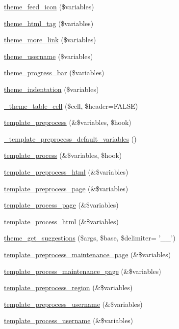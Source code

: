 \begin{DoxyCompactItemize}
\item 
\hyperlink{group__themeable_gaf7ed9df27bf344443ce927e3650adfbd}{theme\_\-feed\_\-icon} (\$variables)
\item 
\hyperlink{group__themeable_ga553aba4a879c7a0b01a85486ca0cea33}{theme\_\-html\_\-tag} (\$variables)
\item 
\hyperlink{group__themeable_ga1f35c4f1e512ae423df22c7a33edf043}{theme\_\-more\_\-link} (\$variables)
\item 
\hyperlink{group__themeable_ga94b6d36f659ae6bf42e7971682cd24eb}{theme\_\-username} (\$variables)
\item 
\hyperlink{group__themeable_ga9892ce57f458f8e372fb04b7a05bbc73}{theme\_\-progress\_\-bar} (\$variables)
\item 
\hyperlink{group__themeable_ga045159ba9e2be46a91a8883328963b2c}{theme\_\-indentation} (\$variables)
\item 
\hyperlink{includes_2theme_8inc_adf2a29e2c6631b7c0ecd833cafda9b40}{\_\-theme\_\-table\_\-cell} (\$cell, \$header=FALSE)
\item 
\hyperlink{includes_2theme_8inc_a3eeb7bcdba7ef4859f99586da264d347}{template\_\-preprocess} (\&\$variables, \$hook)
\item 
\hyperlink{includes_2theme_8inc_a1c517bff2855f9fb2b2949c66d1685db}{\_\-template\_\-preprocess\_\-default\_\-variables} ()
\item 
\hyperlink{includes_2theme_8inc_a9b4d56c55dab2c59b7af6f71d6b1a940}{template\_\-process} (\&\$variables, \$hook)
\item 
\hyperlink{includes_2theme_8inc_a5bc9f37111330a160833274482ad866a}{template\_\-preprocess\_\-html} (\&\$variables)
\item 
\hyperlink{includes_2theme_8inc_a128dae24f990d8ba4710ac78b0584c11}{template\_\-preprocess\_\-page} (\&\$variables)
\item 
\hyperlink{includes_2theme_8inc_aa9c8d115ebdc2baeae402b3d7e6b392b}{template\_\-process\_\-page} (\&\$variables)
\item 
\hyperlink{includes_2theme_8inc_abccf98b29e23c1a9249068558d687da7}{template\_\-process\_\-html} (\&\$variables)
\item 
\hyperlink{includes_2theme_8inc_af13ff730d76e46395bc8bd8298bfa724}{theme\_\-get\_\-suggestions} (\$args, \$base, \$delimiter= '\_\-\_\-')
\item 
\hyperlink{includes_2theme_8inc_a14a92df5f5e74cebcf7fb680885e58a5}{template\_\-preprocess\_\-maintenance\_\-page} (\&\$variables)
\item 
\hyperlink{includes_2theme_8inc_a00d988137020fd53ecaab7dfd4d9b1a5}{template\_\-process\_\-maintenance\_\-page} (\&\$variables)
\item 
\hyperlink{includes_2theme_8inc_a587933392ed2e45a220b08c5708ecaab}{template\_\-preprocess\_\-region} (\&\$variables)
\item 
\hyperlink{includes_2theme_8inc_a102e6392077c4dc3810ec48fdf60fd8c}{template\_\-preprocess\_\-username} (\&\$variables)
\item 
\hyperlink{includes_2theme_8inc_abc04f244a6775dd537c6dd2a7397060c}{template\_\-process\_\-username} (\&\$variables)
\end{DoxyCompactItemize}


